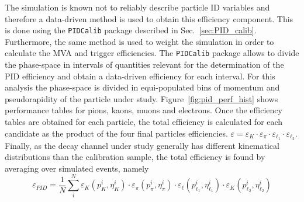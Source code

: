 The simulation is known not to reliably describe particle ID variables
and therefore a data-driven method is used to obtain this efficiency component.
This is done using the \verb!PIDCalib! package described in Sec.~\ref{sec:PID_calib}.
Furthermore, the same method is used to weight the simulation in order to calculate the MVA and trigger efficiencies.
The \verb!PIDCalib! package allows to divide the phase-space in intervals of quantities relevant for the determination 
of the PID efficiency and obtain a data-driven efficiency for each interval. For this analysis the phase-space
is divided in equi-populated bins of momentum and pseudorapidity of the particle under study.
Figure~\ref{fig:pid_perf_hist} shows performance tables for pions, kaons, muons and electrons.
Once the efficiency tables are obtained for each particle, the total efficiency
is calculated for each candidate as the product of the four final particles efficiencies.
$\varepsilon = \varepsilon_K\cdot\varepsilon_\pi\cdot\varepsilon_{\ell_1}\cdot\varepsilon_{\ell_2}$.
Finally, as the decay channel under study generally has different kinematical distributions than the calibration sample,
the total efficiency is found by averaging over simulated events, namely
%
\begin{equation}
\varepsilon_{PID} = \frac{1}{N} \sum_i^N \varepsilon_K(p_K^i,\eta_K^i) \cdot \varepsilon_\pi(p_\pi^i,\eta_\pi^i) \cdot \varepsilon_\ell(p_{\ell_1}^i,\eta_{\ell_1}^i) \cdot \varepsilon_K(p_{\ell_2}^i,\eta_{\ell_2}^i)
\end{equation}
%
